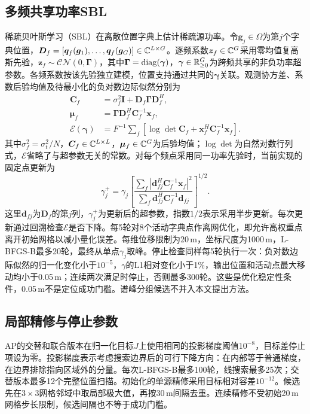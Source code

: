 \subsection{多频共享功率SBL}
稀疏贝叶斯学习（SBL）在离散位置字典上估计稀疏源功率。令$\bm g_j\in\Omega$为第$j$个字典位置，$\bm D_f=[\bm q_f(\bm g_1),\ldots,\bm q_f(\bm g_G)]\in\mathbb C^{L\times G}$。逐频系数$\bm z_f\in\mathbb C^G$采用零均值复高斯先验，$\bm z_f\sim\mathcal{CN}(0,\bm\Gamma)$，其中$\bm\Gamma=\operatorname{diag}(\bm\gamma)$，$\bm\gamma\in\mathbb R_{\ge0}^G$为跨频共享的非负功率超参数\cite{Nannuru2019}。各频系数按该先验独立建模，位置支持通过共同的$\bm\gamma$关联。观测协方差、系数后验均值及待最小化的负对数边际似然分别为
\begin{align}
 \bm C_f&=\sigma_f^2\bm I+\bm D_f\bm\Gamma\bm D_f^H,\label{eq:sblCov}\\
 \bm\mu_f&=\bm\Gamma\bm D_f^H\bm C_f^{-1}\bm x_f,\nonumber\\
 \mathcal E(\bm\gamma)&=F^{-1}\sum_f[\log\det\bm C_f+\bm x_f^H\bm C_f^{-1}\bm x_f] .\label{eq:sblEvidence}
\end{align}
其中$\sigma_f^2=\sigma_t^2/N$，$\bm C_f\in\mathbb C^{L\times L}$，$\bm\mu_f\in\mathbb C^G$为后验均值；$\log\det$为自然对数行列式，$\mathcal E$省略了与超参数无关的常数。对每个频点采用同一功率先验时，当前实现的固定点更新为
\begin{equation}
 \gamma_j^+=\gamma_j\left[
 \frac{\sum_f|\bm d_{fj}^H\bm C_f^{-1}\bm x_f|^2}
 {\sum_f\bm d_{fj}^H\bm C_f^{-1}\bm d_{fj}}
 \right]^{1/2} .\label{eq:sblUpdate}
\end{equation}
这里$\bm d_{fj}$为$\bm D_f$的第$j$列，$\gamma_j^+$为更新后的超参数，指数$1/2$表示采用半步更新。每次更新通过回溯检查$\mathcal E$是否下降。每5轮对8个活动字典点作离网优化，即允许高权重点离开初始网格以减小量化误差。每维位移限制为20\,m，坐标尺度为1000\,m，L-BFGS-B最多20轮，最终从单点$\gamma_j$取峰。停止检查同样每5轮执行一次：负对数边际似然的归一化变化小于$10^{-5}$，$\gamma$的L1相对变化小于1\%，输出位置和活动点最大移动均小于0.05\,m；连续两次满足时停止，否则最多300轮。这些是优化稳定性条件，0.05\,m不是定位成功门槛。谱峰分组候选不并入本文提出方法。

\subsection{局部精修与停止参数}
AP的交替和联合版本在归一化目标$J$上使用相同的投影梯度阈值$10^{-8}$，目标差停止项设为零。投影梯度表示考虑搜索边界后的可行下降方向：在内部等于普通梯度，在边界排除指向区域外的分量。每次L-BFGS-B最多100轮，线搜索最多25次；交替版本最多12个完整位置扫描。初始化的单源精修采用目标相对容差$10^{-12}$。候选先在$3\times3$网格邻域中取局部极大值，再按30\,m间隔去重。连续精修不受初始20\,m网格步长限制，候选间隔也不等于成功门槛。

